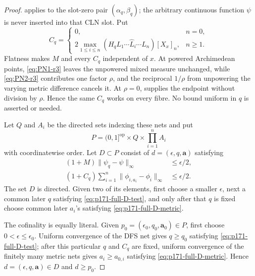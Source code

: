 \begin{proof}
 applies to the slot-zero pair
\((\alpha_q,\beta_q)\); the arbitrary continuous function \(\psi\) is
never inserted into that CLN slot.  Put
\begin{equation}
 C_q=
 \begin{cases}
  0,&n=0,\\[1mm]
  2\displaystyle\max_{1\leq i\leq n}
   (H_qL_1\cdots\widehat L_i\cdots L_n)[X_x]_n,&n\geq1.
 \end{cases}
 \label{eq:p171-full-cln-constant}
\end{equation}
Flatness makes \(M\) and every \(C_q\) independent of \(x\).  At powered
Archimedean points, \eqref{eq:PN1-r3} leaves the unpowered mixed measure
unchanged, while \eqref{eq:PN2-r3} contributes one factor \(\rho\), and the
reciprocal
\(1/\rho\) from unpowering the varying metric difference cancels it.
At \(\rho=0\), \cite[Lemma~4.10]{PS23Hybrid} supplies the endpoint without
division by \(\rho\).  Hence the same \(C_q\) works on every fibre.  No
bound uniform in \(q\) is asserted or needed.

Let \(Q\) and \(A_i\) be the directed sets indexing these nets and put
\begin{equation}
 P=(0,1]^{\mathrm{op}}\times Q\times\prod_{i=1}^nA_i
 \label{eq:p171-full-product-set}
\end{equation}
with coordinatewise order.  Let \(D\subset P\) consist of
\(d=(\epsilon,q,\mathbf a)\) satisfying
\begin{align}
 (1+M)\|\psi_q-\psi\|_\infty&\leq\epsilon/2,
 \label{eq:p171-full-D-test}\\
 (1+C_q)\sum_{i=1}^n
 \|\phi_{i,a_i}-\phi_i\|_\infty&\leq\epsilon/2.
 \label{eq:p171-full-D-metric}
\end{align}
The set \(D\) is directed.  Given two of its elements, first choose a
smaller \(\epsilon\), next a common later \(q\) satisfying
\eqref{eq:p171-full-D-test}, and only after that \(q\) is fixed choose
common later \(a_i\)'s satisfying \eqref{eq:p171-full-D-metric}.

The cofinality is equally literal.  Given
\(p_0=(\epsilon_0,q_0,\mathbf a_0)\in P\), first choose
\(0<\epsilon\leq\epsilon_0\).  Uniform convergence of the DFS net gives
\(q\geq q_0\) satisfying \eqref{eq:p171-full-D-test}; after this
particular \(q\) and \(C_q\) are fixed, uniform convergence of the finitely
many metric nets gives \(a_i\geq a_{0,i}\) satisfying
\eqref{eq:p171-full-D-metric}.  Hence
\(d=(\epsilon,q,\mathbf a)\in D\) and \(d\geq p_0\).


\end{proof}
